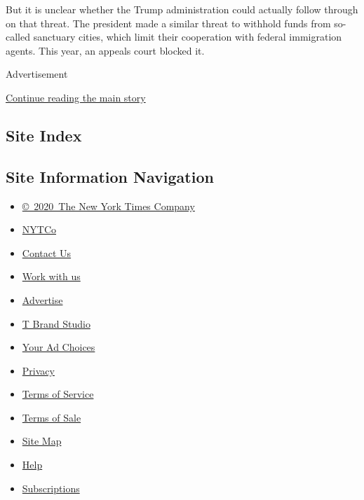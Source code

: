 But it is unclear whether the Trump administration could actually follow
through on that threat. The president made a similar threat to withhold
funds from so-called sanctuary cities, which limit their cooperation
with federal immigration agents. This year, an appeals court blocked it.

Advertisement

\protect\hyperlink{after-bottom}{Continue reading the main story}

\hypertarget{site-index}{%
\subsection{Site Index}\label{site-index}}

\hypertarget{site-information-navigation}{%
\subsection{Site Information
Navigation}\label{site-information-navigation}}

\begin{itemize}
\tightlist
\item
  \href{https://help.nytimes.com/hc/en-us/articles/115014792127-Copyright-notice}{©~2020~The
  New York Times Company}
\end{itemize}

\begin{itemize}
\tightlist
\item
  \href{https://www.nytco.com/}{NYTCo}
\item
  \href{https://help.nytimes.com/hc/en-us/articles/115015385887-Contact-Us}{Contact
  Us}
\item
  \href{https://www.nytco.com/careers/}{Work with us}
\item
  \href{https://nytmediakit.com/}{Advertise}
\item
  \href{http://www.tbrandstudio.com/}{T Brand Studio}
\item
  \href{https://www.nytimes.com/privacy/cookie-policy\#how-do-i-manage-trackers}{Your
  Ad Choices}
\item
  \href{https://www.nytimes.com/privacy}{Privacy}
\item
  \href{https://help.nytimes.com/hc/en-us/articles/115014893428-Terms-of-service}{Terms
  of Service}
\item
  \href{https://help.nytimes.com/hc/en-us/articles/115014893968-Terms-of-sale}{Terms
  of Sale}
\item
  \href{https://spiderbites.nytimes.com}{Site Map}
\item
  \href{https://help.nytimes.com/hc/en-us}{Help}
\item
  \href{https://www.nytimes.com/subscription?campaignId=37WXW}{Subscriptions}
\end{itemize}
